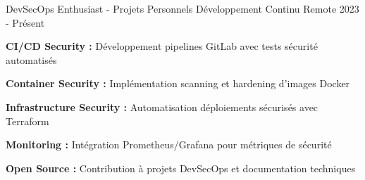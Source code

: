 \begin{cventries}
    \cventry
    {DevSecOps Enthusiast - Projets Personnels} %
    {Développement Continu} %
    {Remote} %
    {2023 - Présent} %
    {
        \begin{cvitems} %
            \item {\textbf{CI/CD Security :} Développement pipelines GitLab avec tests sécurité automatisés}
            \item {\textbf{Container Security :} Implémentation scanning et hardening d'images Docker}
            \item {\textbf{Infrastructure Security :} Automatisation déploiements sécurisés avec Terraform}
            \item {\textbf{Monitoring :} Intégration Prometheus/Grafana pour métriques de sécurité}
            \item {\textbf{Open Source :} Contribution à projets DevSecOps et documentation techniques}
        \end{cvitems}
    }

\end{cventries}